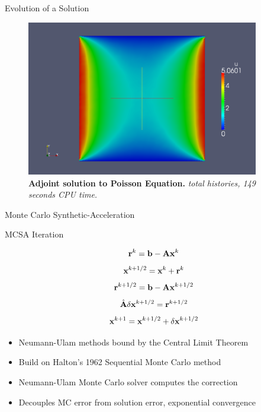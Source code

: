 \documentclass{beamer}
\begin{document}
\begin{frame}{Evolution of a Solution}

  \begin{figure}[h!]
    \begin{center}
      \includegraphics[width=4in]{adjoint_10000000.png}
    \end{center}
    \caption{\textbf{Adjoint solution to Poisson Equation.}
      \textit{ total histories, 149 seconds CPU time.} }
  \end{figure}

\end{frame}

\begin{frame}{Monte Carlo Synthetic-Acceleration}

  \begin{beamerboxesrounded}[upper=boxheadcolor,lower=boxbodycolor,shadow=true]
    {MCSA Iteration}

    \[
    \mathbf{r}^{k} = \mathbf{b} - \mathbf{A}\mathbf{x}^{k}
    \]
    \[
    \mathbf{x}^{k+1/2} = \mathbf{x}^k + \mathbf{r}^k
    \]
    \[
    \mathbf{r}^{k+1/2} = \mathbf{b} - \mathbf{A}\mathbf{x}^{k+1/2}
    \]
    \[
    \hat{\mathbf{A}}\delta\mathbf{x}^{k+1/2} = \mathbf{r}^{k+1/2}
    \]
    \[
    \mathbf{x}^{k+1} = \mathbf{x}^{k+1/2} + \delta \mathbf{x}^{k+1/2}
    \]

  \end{beamerboxesrounded}

  \medskip \medskip
  \begin{itemize}
  \item Neumann-Ulam methods bound by the Central Limit Theorem
  \item Build on Halton's 1962 Sequential Monte Carlo method
  \item Neumann-Ulam Monte Carlo solver computes the correction
  \item Decouples MC error from solution error, exponential convergence
  \end{itemize}

\end{frame}
\end{document}
